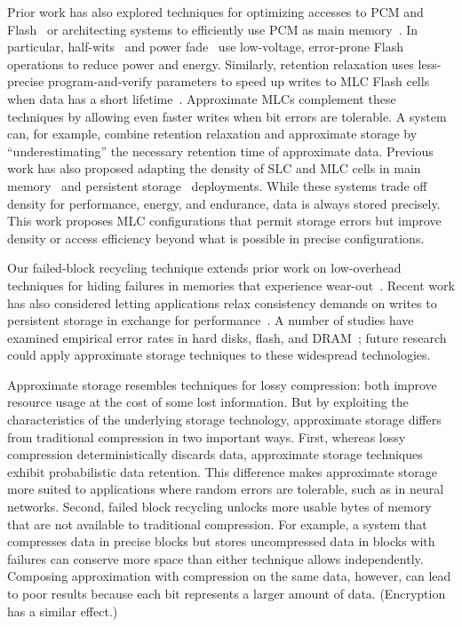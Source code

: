 Prior work has also explored techniques for optimizing accesses to PCM and
Flash~\cite{writecancel,improvingwrites} or architecting systems to
efficiently use PCM as main
memory~\cite{durable-pcm-mm,pcm-dram-alt,ecp,drm,qureshi-pcm-mm}. In particular, half-wits~\cite{halfwits} and
power fade~\cite{powerfade} use low-voltage, error-prone
Flash operations to reduce power and energy.
Similarly, retention relaxation uses less-precise program-and-verify parameters to
speed up writes to MLC Flash cells when data has a short
lifetime~\cite{flash-retention-relax}. Approximate MLCs complement these
techniques by allowing even faster writes when bit errors are tolerable. A
system can, for example, combine retention relaxation and approximate storage
by ``underestimating'' the necessary retention time of approximate data.
%
Previous work has also proposed adapting the density of SLC and MLC cells in main
memory~\cite{morphablepcm} and persistent storage~\cite{adams} deployments.
While these systems trade off density for performance, energy, and endurance,
data is always stored precisely. This work proposes MLC
configurations that permit storage errors but improve density or access
efficiency beyond what is possible in precise configurations.


Our failed-block recycling technique extends prior work on low-overhead
techniques for hiding failures in memories that experience
wear-out~\cite{ecp,safer,payg,zombie}.
Recent work has also considered letting applications relax
consistency demands on writes to persistent storage in exchange for performance~\cite{mempersistency,optfs}.
A number of studies have examined empirical error rates in hard disks, flash,
and DRAM~\cite{diskmttf,googledisk,flasherror,flasherrors};
future research could apply approximate storage techniques to
these widespread technologies.

Approximate storage resembles techniques for lossy compression: both improve
resource usage at the cost of some lost information. But by exploiting the
characteristics of the underlying storage technology, approximate storage
differs from traditional compression in two important ways. First, whereas
lossy compression deterministically discards data, approximate storage
techniques exhibit probabilistic data retention. This difference makes
approximate storage more suited to applications where random errors are
tolerable, such as in neural networks. Second, failed block recycling unlocks
more usable bytes of memory that are not available to traditional compression.
For example, a system that compresses data in precise blocks but stores
uncompressed data in blocks with failures can conserve more space than either
technique allows independently.
Composing approximation with compression on the same data, however, can lead
to poor results because each bit represents a larger amount of data.
(Encryption has a similar effect.)

